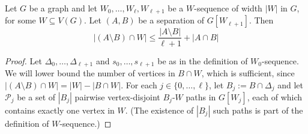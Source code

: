 \documentclass{patmorin}
\begin{document}
\begin{lem}\label{uniform_balance}
  Let $G$ be a graph and let $W_0,\ldots,W_{\ell},W_{\ell+1}$ be a $W$-sequence of width $|W|$ in $G$, for some $W\subseteq V(G)$. Let $(A,B)$ be a separation of $G[W_{\ell+1}]$. Then
  \[
     |(A\setminus B)\cap W| \le \frac{|A\setminus B|}{\ell+1} + |A\cap B|
  \]
\end{lem}

\begin{proof}
  Let $\Delta_0,\ldots,\Delta_{\ell+1}$ and $s_0,\ldots,s_{\ell+1}$ be as in the definition of $W_0$-sequence.
  We will lower bound the number of vertices in $B\cap W$, which is sufficient, since $|(A\setminus B)\cap W|=|W|-|B\cap W|$.  For each $j\in\{0,\ldots,\ell\}$, let $B_j:=B\cap \Delta_j$ and let $\mathcal{P}_j$ be a set of $|B_j|$ pairwise vertex-disjoint $B_j$-$W$ paths in $G[W_j]$, each of which contains exactly one vertex in $W$.  (The existence of $|B_j|$ such paths is part of the definition of $W$-sequence.)


\end{proof}
\end{document}
